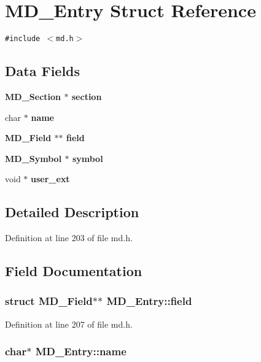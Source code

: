 \section{MD\_\-Entry Struct Reference}
\label{structMD__Entry}
{\tt \#include $<$md.h$>$}

\subsection*{Data Fields}
\begin{CompactItemize}
\item 
\bf{MD\_\-Section} $\ast$ \bf{section}
\item 
char $\ast$ \bf{name}
\item 
\bf{MD\_\-Field} $\ast$$\ast$ \bf{field}
\item 
\bf{MD\_\-Symbol} $\ast$ \bf{symbol}
\item 
void $\ast$ \bf{user\_\-ext}
\end{CompactItemize}


\subsection{Detailed Description}




Definition at line 203 of file md.h.

\subsection{Field Documentation}
\subsubsection{\setlength{\rightskip}{0pt plus 5cm}struct \bf{MD\_\-Field}$\ast$$\ast$ \bf{MD\_\-Entry::field}}\label{structMD__Entry_5847ef78f54b54110bcf2207ae2f812e}




Definition at line 207 of file md.h.
\subsubsection{\setlength{\rightskip}{0pt plus 5cm}char$\ast$ \bf{MD\_\-Entry::name}}\label{structMD__Entry_0bffa96670ce4a276af5a502e8f18f06}




